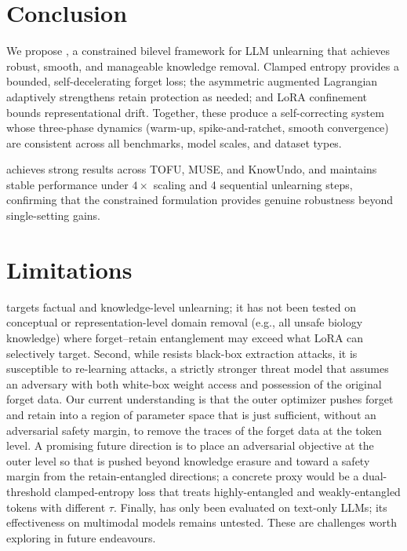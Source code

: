 \section{Conclusion}
\label{sec:conclusion}

We propose \method, a constrained bilevel framework for LLM unlearning that achieves robust, smooth, and manageable knowledge removal.
Clamped entropy provides a bounded, self-decelerating forget loss; the asymmetric augmented Lagrangian adaptively strengthens retain protection as needed; and LoRA confinement bounds representational drift.
Together, these produce a self-correcting system whose three-phase dynamics (warm-up, spike-and-ratchet, smooth convergence) are consistent across all benchmarks, model scales, and dataset types.

\method achieves strong results across TOFU, MUSE, and KnowUndo, and maintains stable performance under $4\times$ scaling and 4 sequential unlearning steps, confirming that the constrained formulation provides genuine robustness beyond single-setting gains.

\section{Limitations}
\label{sec:limitations}
\method targets factual and knowledge-level unlearning; it has not been tested on conceptual or representation-level domain removal (e.g., all unsafe biology knowledge) where forget--retain entanglement may exceed what LoRA can selectively target.
Second, while \method resists black-box extraction attacks, it is susceptible to re-learning attacks, a strictly stronger threat model that assumes an adversary with both white-box weight access and possession of the original forget data.
Our current understanding is that the outer optimizer pushes forget and retain into a region of parameter space that is just sufficient, without an adversarial safety margin, to remove the traces of the forget data at the token level.
A promising future direction is to place an adversarial objective at the outer level so that \method is pushed beyond knowledge erasure and toward a safety margin from the retain-entangled directions; a concrete proxy would be a dual-threshold clamped-entropy loss that treats highly-entangled and weakly-entangled tokens with different $\tau$.
Finally, \method has only been evaluated on text-only LLMs; its effectiveness on multimodal models remains untested.
These are challenges worth exploring in future endeavours.
